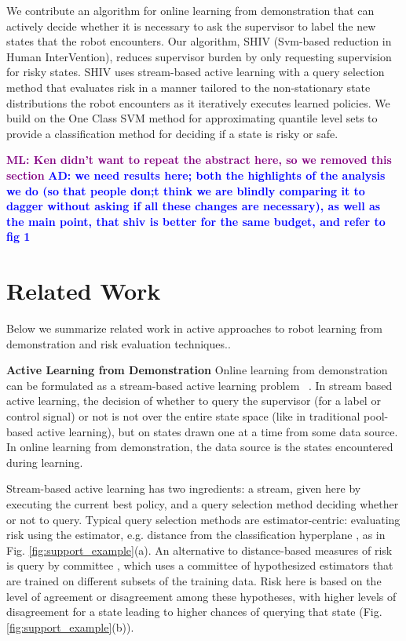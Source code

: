 \documentclass[10pt, conference]{ieeeconf}      %
\newcommand{\adnote}[1]{\ifthenelse{ \boolean{include-notes}}%
 {\textcolor{blue}{\textbf{AD: #1}}}{}}
\newcommand{\mlnote}[1]{\ifthenelse{ \boolean{include-notes}}%
 {\textcolor{purple}{\textbf{ML: #1}}}{}}
\begin{document}
We contribute an algorithm for online learning from demonstration that can actively decide whether it is necessary to ask the supervisor to label the new states that the robot encounters. Our algorithm, SHIV  (Svm-based reduction in Human InterVention), reduces supervisor burden by only requesting supervision for risky states. SHIV uses stream-based active learning with a query selection method that evaluates risk in a manner tailored to the non-stationary state distributions the robot encounters as it iteratively executes learned policies. We build on the One Class SVM method for approximating quantile level sets \cite{scholkopf2001estimating} to provide a classification method for deciding if a state is risky or safe.

\mlnote{Ken didn't want to repeat the abstract here, so we removed this section}
\adnote{we need results here; both the highlights of the analysis we do (so that people don;t think we are blindly comparing it to dagger without asking if all these changes are necessary), as well as the main point, that shiv is better for the same budget, and refer to fig 1}





\section{Related Work}
Below we summarize related work in active approaches to robot learning from demonstration and risk evaluation techniques.. 

\noindent\textbf{Active Learning from Demonstration}
Online learning from demonstration can be formulated as a stream-based active learning problem ~\cite{atlas1990training,cohn1994improving}. In stream based active learning, the decision of whether to query the supervisor (for a label or control signal) or not is not over the entire state space (like in traditional pool-based active learning), but on states drawn one at a time from some data source. In  online learning  from demonstration, the data source is the states encountered during learning. 

Stream-based active learning has two ingredients: a stream, given here by executing the current best policy, and a query selection method deciding whether or not to query. Typical query selection methods are estimator-centric:  evaluating risk using the estimator, e.g. distance from the classification hyperplane \cite{tong2002support}, as in Fig. \ref{fig:support_example}(a). An alternative to distance-based measures of  risk is query by committee  \cite{breiman1996bagging}, which uses a committee of hypothesized estimators that are trained on different subsets of the training data. Risk here is based on the level of agreement or disagreement among these hypotheses, with higher levels of disagreement for a state leading to higher chances of querying that state (Fig. \ref{fig:support_example}(b)).
\end{document}
